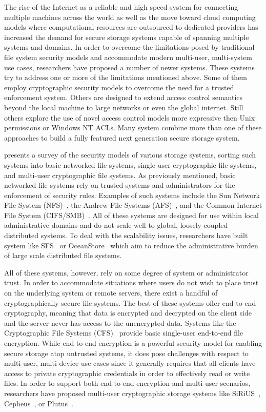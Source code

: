 The rise of the Internet as a reliable and high speed system for
connecting multiple machines across the world as well as the move
toward cloud computing models where computational resources are
outsourced to dedicated providers has increased the demand for secure
storage systems capable of spanning multiple systems and domains. In
order to overcome the limitations posed by traditional file system
security models and accommodate modern multi-user, multi-system use
cases, researchers have proposed a number of newer systems. These
systems try to address one or more of the limitations mentioned
above. Some of them employ cryptographic security models to overcome
the need for a trusted enforcement system. Others are designed to
extend access control semantics beyond the local machine to large
networks or even the global internet. Still others explore the use of
novel access control models more expressive then Unix permissions or
Windows NT ACLs. Many system combine more than one of these approaches
to build a fully featured next generation secure storage system.

\cite{Kher2005} presents a survey of the security models of various
storage systems, sorting such systems into basic networked file
systems, single-user cryptographic file systems, and multi-user
cryptographic file systems. As previously mentioned, basic networked
file systems rely on trusted systems and administrators for the
enforcement of security rules. Examples of such systems include the
Sun Network File System (NFS)~\cite{Sandberg1985}, the Andrew File
Systems (AFS)~\cite{Howard1988}, and the Common Internet File System
(CIFS/SMB)~\cite{microsoft-smb2}. All of these systems are designed
for use within local administrative domains and do not scale well to
global, loosely-coupled distributed systems. To deal with the
scalability issues, researchers have built system like
SFS~\cite{Mazieres1999} or OceanStore~\cite{kubiatowicz2000} which aim
to reduce the administrative burden of large scale distributed file
systems.

All of these systems, however, rely on some degree of system or
administrator trust. In order to accommodate situations where users do
not wish to place trust on the underlying system or remote servers,
there exist a handful of cryptographically-secure file systems. The
best of these systems offer end-to-end cryptography, meaning that data
is encrypted and decrypted on the client side and the server never has
access to the unencrypted data.  Systems like the Cryptographic File
Systems (CFS)~\cite{Blaze1993} provide basic single-user end-to-end
file encryption. While end-to-end encryption is a powerful security
model for enabling secure storage atop untrusted systems, it does pose
challenges with respect to multi-user, multi-device use cases since it
generally requires that all clients have access to private
cryptographic credentials in order to effectively read or write
files. In order to support both end-to-end encryption and multi-user
scenarios, researchers have proposed multi-user cryptographic storage
systems like SiRiUS~\cite{Goh2003}, Cepheus~\cite{Fu1998}, or
Plutus~\cite{kallahalla2003}.

